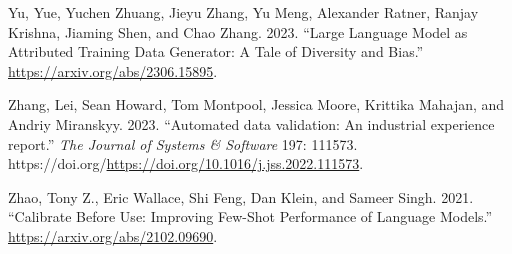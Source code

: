 \documentclass[
  letterpaper,
  DIV=11,
  numbers=noendperiod]{scrartcl}
\newlength{\cslhangindent}
\newlength{\cslentryspacingunit} %
\newenvironment{CSLReferences}[2] %
 {%
  \setlength{\parindent}{0pt}
  \ifodd #1
  \let\oldpar\par
  \def\par{\hangindent=\cslhangindent\oldpar}
  \fi
  \setlength{\parskip}{#2\cslentryspacingunit}
 }%
 {}
\begin{document}
\begin{CSLReferences}{1}{0}
\leavevmode{}%
Yu, Yue, Yuchen Zhuang, Jieyu Zhang, Yu Meng, Alexander Ratner, Ranjay
Krishna, Jiaming Shen, and Chao Zhang. 2023. {``{Large Language Model as
Attributed Training Data Generator: A Tale of Diversity and Bias}.''}
\url{https://arxiv.org/abs/2306.15895}.

\leavevmode{}%
Zhang, Lei, Sean Howard, Tom Montpool, Jessica Moore, Krittika Mahajan,
and Andriy Miranskyy. 2023. {``{Automated data validation: An industrial
experience report}.''} \emph{{The Journal of Systems \& Software}} 197:
111573. https://doi.org/\url{https://doi.org/10.1016/j.jss.2022.111573}.

\leavevmode{}%
Zhao, Tony Z., Eric Wallace, Shi Feng, Dan Klein, and Sameer Singh.
2021. {``{Calibrate Before Use: Improving Few-Shot Performance of
Language Models}.''} \url{https://arxiv.org/abs/2102.09690}.

\end{CSLReferences}
\end{document}
